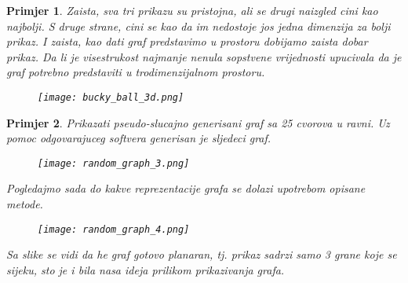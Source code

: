 \documentclass[11pt]{article}
\newtheorem{example}{Primjer}
\begin{document}
\begin{example}
        Zaista, sva tri prikazu su pristojna, ali se drugi naizgled cini kao najbolji.
        S druge strane, cini se kao da im nedostoje jos jedna dimenzija za bolji prikaz. I zaista, kao dati graf predstavimo u prostoru dobijamo zaista dobar prikaz.
        Da li je visestrukost najmanje nenula sopstvene vrijednosti upucivala da je graf potrebno predstaviti u trodimenzijalnom prostoru.

        \begin{figure}[h]
            \centering
            \texttt{[image: bucky\_ball\_3d.png]}
        \end{figure}
        
    \end{example}
    
    \begin{example}
        Prikazati pseudo-slucajno generisani graf sa 25 cvorova u ravni.
        Uz pomoc odgovarajuceg softvera generisan je sljedeci graf.
        
        \begin{figure}[h]
            \centering
            \texttt{[image: random\_graph\_3.png]}
        \end{figure}
        
        Pogledajmo sada do kakve reprezentacije grafa se dolazi upotrebom opisane metode.
        
        \begin{figure}[h]
            \centering
            \texttt{[image: random\_graph\_4.png]}
        \end{figure}

        Sa slike se vidi da he graf gotovo planaran, tj. prikaz sadrzi samo 3 grane koje se sijeku, sto je i bila nasa ideja prilikom prikazivanja grafa.
    \end{example}
\end{document}
